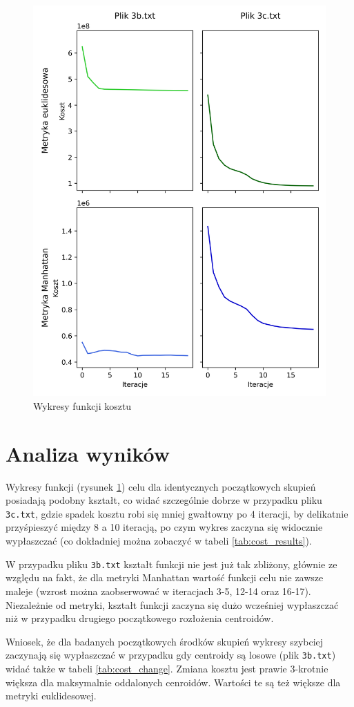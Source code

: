 \documentclass[a4paper,11pt]{article}
\begin{document}
\begin{figure}[H] 
    \label{fig:chart}
	\begin{center}
	\includegraphics[width=1\textwidth]{img/zad3_fig.png}
    \caption{Wykresy funkcji kosztu}
	\end{center}
\end{figure}

\newpage
\section{Analiza wyników}

Wykresy funkcji (rysunek \ref{fig:chart}) celu dla identycznych początkowych skupień posiadają podobny kształt, co widać szczególnie dobrze w przypadku pliku \verb|3c.txt|, gdzie spadek kosztu robi się mniej gwałtowny po 4 iteracji, by delikatnie przyśpieszyć między 8 a 10 iteracją, po czym wykres zaczyna się widocznie wypłaszczać (co dokładniej można zobaczyć w tabeli \ref{tab:cost_results}).

W przypadku pliku \verb|3b.txt| kształt funkcji nie jest już tak zbliżony, głównie ze względu na fakt, że dla metryki Manhattan wartość funkcji celu nie zawsze maleje (wzrost można zaobserwować w iteracjach 3-5, 12-14 oraz 16-17). Niezależnie od metryki, kształt funkcji zaczyna się dużo wcześniej wypłaszczać niż w przypadku drugiego początkowego rozłożenia centroidów. 

Wniosek, że dla badanych początkowych środków skupień wykresy szybciej zaczynają się wypłaszczać w przypadku gdy centroidy są losowe (plik \verb|3b.txt|) widać także w tabeli \ref{tab:cost_change}. Zmiana kosztu jest prawie 3-krotnie większa dla maksymalnie oddalonych cenroidów. Wartości te są też większe dla metryki euklidesowej.
\end{document}
